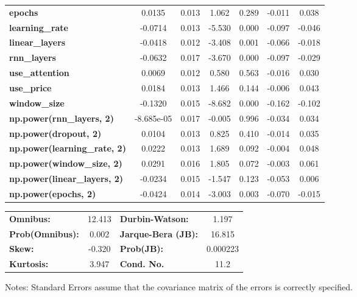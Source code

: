 \begin{center}
\begin{tabular}{lcccccc}
\textbf{epochs}                            &       0.0135  &        0.013     &     1.062  &         0.289        &       -0.011    &        0.038     \\
\textbf{learning\_rate}                    &      -0.0714  &        0.013     &    -5.530  &         0.000        &       -0.097    &       -0.046     \\
\textbf{linear\_layers}                    &      -0.0418  &        0.012     &    -3.408  &         0.001        &       -0.066    &       -0.018     \\
\textbf{rnn\_layers}                       &      -0.0632  &        0.017     &    -3.670  &         0.000        &       -0.097    &       -0.029     \\
\textbf{use\_attention}                    &       0.0069  &        0.012     &     0.580  &         0.563        &       -0.016    &        0.030     \\
\textbf{use\_price}                        &       0.0184  &        0.013     &     1.466  &         0.144        &       -0.006    &        0.043     \\
\textbf{window\_size}                      &      -0.1320  &        0.015     &    -8.682  &         0.000        &       -0.162    &       -0.102     \\
\textbf{np.power(rnn\_layers, 2)}          &   -8.685e-05  &        0.017     &    -0.005  &         0.996        &       -0.034    &        0.034     \\
\textbf{np.power(dropout, 2)}              &       0.0104  &        0.013     &     0.825  &         0.410        &       -0.014    &        0.035     \\
\textbf{np.power(learning\_rate, 2)}       &       0.0222  &        0.013     &     1.689  &         0.092        &       -0.004    &        0.048     \\
\textbf{np.power(window\_size, 2)}         &       0.0291  &        0.016     &     1.805  &         0.072        &       -0.003    &        0.061     \\
\textbf{np.power(linear\_layers, 2)}       &      -0.0234  &        0.015     &    -1.547  &         0.123        &       -0.053    &        0.006     \\
\textbf{np.power(epochs, 2)}               &      -0.0424  &        0.014     &    -3.003  &         0.003        &       -0.070    &       -0.015     \\
\bottomrule
\end{tabular}
\begin{tabular}{lclc}
\textbf{Omnibus:}       & 12.413 & \textbf{  Durbin-Watson:     } &    1.197  \\
\textbf{Prob(Omnibus):} &  0.002 & \textbf{  Jarque-Bera (JB):  } &   16.815  \\
\textbf{Skew:}          & -0.320 & \textbf{  Prob(JB):          } & 0.000223  \\
\textbf{Kurtosis:}      &  3.947 & \textbf{  Cond. No.          } &     11.2  \\
\bottomrule
\end{tabular}
\end{center}

Notes: \newline
 [1] Standard Errors assume that the covariance matrix of the errors is correctly specified.